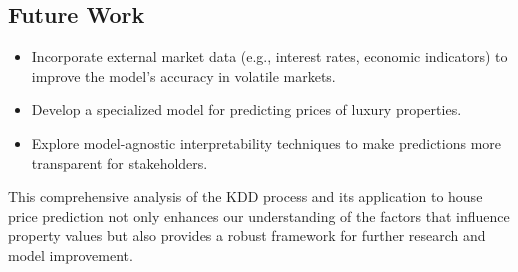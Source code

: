 \documentclass{article}
\begin{document}
\subsection{Future Work}
\begin{itemize}
    \item Incorporate external market data (e.g., interest rates, economic indicators) to improve the model's accuracy in volatile markets.
    \item Develop a specialized model for predicting prices of luxury properties.
    \item Explore model-agnostic interpretability techniques to make predictions more transparent for stakeholders.
\end{itemize}

This comprehensive analysis of the KDD process and its application to house price prediction not only enhances our understanding of the factors that influence property values but also provides a robust framework for further research and model improvement.
\end{document}
